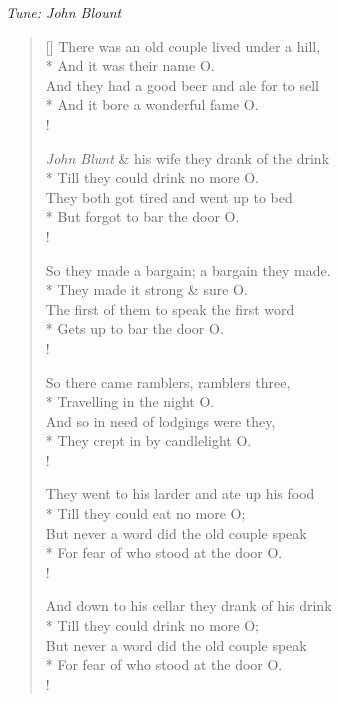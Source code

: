 \documentclass[MAIN]{subfiles}
\begin{document}
\begin{center}
\emph{Tune: John Blount}
\end{center}

\bigskip

\settowidth{\versewidth}{And they had a good beer and ale for to sell}
\begin{verse}[\versewidth]
There was an old couple lived under a hill,\\*
\vin And  it was their name O.\\
And they had a good beer and ale for to sell\\*
\vin And it bore a wonderful fame O.\\!

\emph{John Blunt} \& his wife they drank of the drink\\*
\vin Till they could drink no more O.\\
They both got tired and went up to bed\\*
\vin But forgot to bar the door O.\\!

So they made a bargain; a bargain they made.\\*
\vin They made it strong \& sure O.\\
The first of them to speak the first word\\*
\vin Gets up to bar the door O.\\!

So there came ramblers, ramblers three,\\*
\vin Travelling in the night O.\\
And so in need of lodgings were they,\\*
\vin They crept in by candlelight O.\\!

They went to his larder and ate up his food\\*
\vin Till they could eat no more O;\\
But never a word did the old couple speak\\*
\vin For fear of who stood at the door O.\\!

And down to his cellar they drank of his drink\\*
\vin Till they could drink no more O;\\
But never a word did the old couple speak\\*
\vin For fear of who stood at the door O.\\!


\end{verse}
\end{document}
